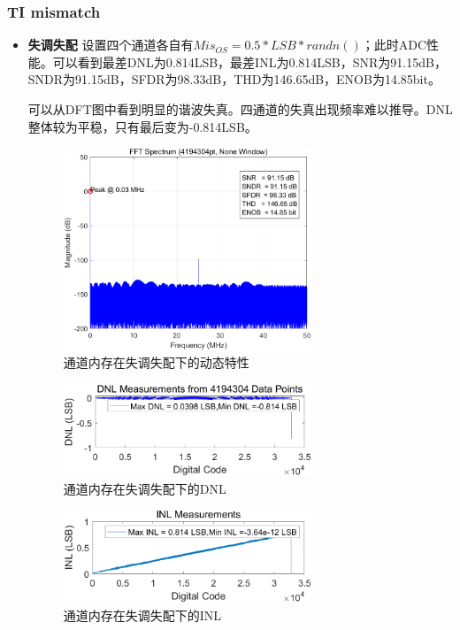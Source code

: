 \documentclass[cs4size,a4paper]{ctexart}
\numberwithin{equation}{section}
\numberwithin{table}{section}
\numberwithin{figure}{section}
\begin{document}
	\subsubsection{TI mismatch}
	\begin{itemize}
		\item \textbf{失调失配} 设置四个通道各自有$Mis_{OS} = 0.5 * LSB * randn()$；此时ADC性能。可以看到最差DNL为0.814LSB，最差INL为0.814LSB，SNR为91.15dB，SNDR为91.15dB，SFDR为98.33dB，THD为146.65dB，ENOB为14.85bit。

		可以从DFT图中看到明显的谐波失真。四通道的失真出现频率难以推导。DNL整体较为平稳，只有最后变为-0.814LSB。
		\begin{figure}[H]
			\centering
			\includegraphics[width=0.7\textwidth]{pic/TIOS/DFT.png}
			\caption{通道内存在失调失配下的动态特性} 
		\end{figure}

		\begin{figure}[H]
			\centering
			\includegraphics[width=0.7\textwidth]{pic/TIOS/DNL.png}
			\caption{通道内存在失调失配下的DNL} 
		\end{figure}

		\begin{figure}[H]
			\centering
			\includegraphics[width=0.7\textwidth]{pic/TIOS/INL.png}
			\caption{通道内存在失调失配下的INL} 
		\end{figure}


\end{itemize}
\end{document}
